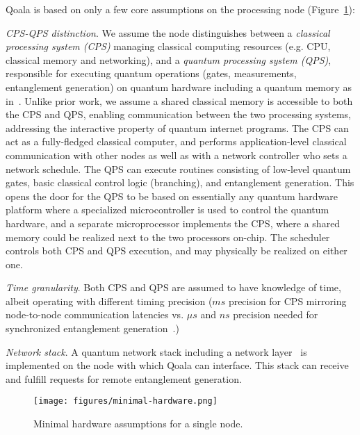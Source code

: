 Qoala is based on only a few core assumptions on the processing node (Figure~\ref{fig:minimal_hardware_assumptions}):

\textit{CPS-QPS distinction}. We assume the node distinguishes between a \textit{classical processing system (CPS)} managing classical computing resources (e.g. CPU, classical memory and networking), and a \textit{quantum processing system (QPS)}, responsible for executing quantum operations (gates, measurements, entanglement generation) on quantum hardware including a quantum memory as in~\cite{dahlberg2022netqasm, pompili2022experimental}.
Unlike prior work, we assume a shared classical memory is accessible to both the CPS and QPS, enabling communication between the two processing systems, addressing the interactive property of quantum internet programs.
The CPS can act as a fully-fledged classical computer, and performs application-level classical communication with other nodes as well as with a network controller who sets a network schedule.
The QPS can execute routines consisting of low-level quantum gates, basic classical control logic (branching), and entanglement generation.
This opens the door for the QPS to be based on essentially any quantum hardware platform where a specialized microcontroller is used to control the quantum hardware, and a separate microprocessor implements the CPS, where a shared memory could be realized next to the two processors on-chip.
The scheduler controls both CPS and QPS execution, and may physically be realized on either one.

\textit{Time granularity}. Both CPS and QPS are assumed to have knowledge of time, albeit operating with different timing precision ($ms$ precision for CPS mirroring node-to-node communication latencies vs. $\mu s$ and $ns$ precision needed for synchronized entanglement generation~\cite{pompili2022experimental, dahlberg2019link}.)

 \textit{Network stack}. A quantum network stack including a network layer~\cite{dahlberg2019link} is implemented on the node with which Qoala can interface. This stack can receive and fulfill requests for remote entanglement generation.
\begin{figure}
    \centering
    \texttt{[image: figures/minimal-hardware.png]}
    \caption{Minimal hardware assumptions for a single node.}
    \label{fig:minimal_hardware_assumptions}
\end{figure}



